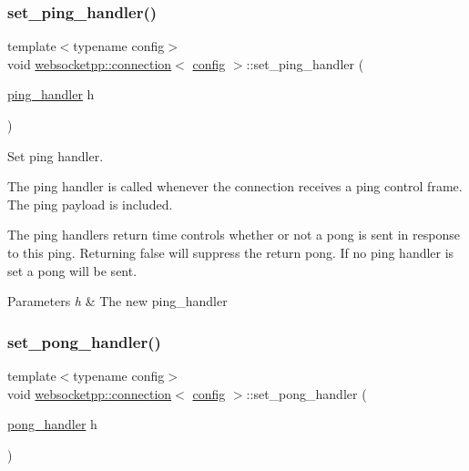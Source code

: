 \subsubsection{\texorpdfstring{set\+\_\+ping\+\_\+handler()}{set\_ping\_handler()}}
{\footnotesize\ttfamily template$<$typename config$>$ \\
void \mbox{\hyperlink{classwebsocketpp_1_1connection}{websocketpp\+::connection}}$<$ \mbox{\hyperlink{classconfig}{config}} $>$\+::set\+\_\+ping\+\_\+handler (\begin{DoxyParamCaption}\item[{\mbox{\hyperlink{namespacewebsocketpp_a9dcaaa7370865f1bcacb55ae715793ef}{ping\+\_\+handler}}}]{h }\end{DoxyParamCaption})\hspace{0.3cm}{\ttfamily [inline]}}



Set ping handler. 

The ping handler is called whenever the connection receives a ping control frame. The ping payload is included.

The ping handler\textquotesingle{}s return time controls whether or not a pong is sent in response to this ping. Returning false will suppress the return pong. If no ping handler is set a pong will be sent.


\begin{DoxyParams}{Parameters}
{\em h} & The new ping\+\_\+handler \\
\hline
\end{DoxyParams}
\mbox{\label{classwebsocketpp_1_1connection_a298795eaa6d554ca5114ff23346d47a9}} 
\subsubsection{\texorpdfstring{set\+\_\+pong\+\_\+handler()}{set\_pong\_handler()}}
{\footnotesize\ttfamily template$<$typename config$>$ \\
void \mbox{\hyperlink{classwebsocketpp_1_1connection}{websocketpp\+::connection}}$<$ \mbox{\hyperlink{classconfig}{config}} $>$\+::set\+\_\+pong\+\_\+handler (\begin{DoxyParamCaption}\item[{\mbox{\hyperlink{namespacewebsocketpp_a1798d54e6d98a481cf870091af84bc1f}{pong\+\_\+handler}}}]{h }\end{DoxyParamCaption})\hspace{0.3cm}{\ttfamily [inline]}}



